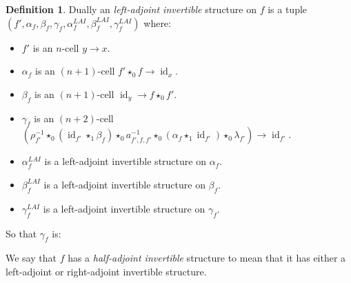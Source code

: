 \documentclass[draft]{article}
\theoremstyle{definition} \newtheorem{definition}{Definition}
\theoremstyle{remark} \newtheorem{remark}{Remark}
\DeclareMathOperator{\id}{id}
\newcommand{\inv}[1]{#1^{-1}} \newcommand{\comp}{\star}
\begin{document}
\begin{definition}
  Dually an \emph{left-adjoint invertible} structure on \(f\) is a
  tuple \((f', \alpha_f, \beta_f, \gamma_f, \alpha_f^{LAI},
  \beta_f^{LAI}, \gamma_f^{LAI})\) where:
  \begin{itemize}
  \item \(f'\) is an \(n\)-cell \(y \to x\).
  \item \(\alpha_f\) is an \((n+1)\)-cell \(f' \comp_0 f \to \id_x\).
  \item \(\beta_f\) is an \((n+1)\)-cell \(\id_y \to f \comp_0 f'\).
  \item \(\gamma_f\) is an \((n+2)\)-cell \((\rho_{f'}^{-1} \comp_0
    (\id_{f'} \comp_1 \beta_f) \comp_0 \inv {a_{f',f,f'}} \comp_0
    (\alpha_f \comp_1 \id_{f'}) \comp_0 \lambda_{f'}) \to \id_{f'}\).
  \item \(\alpha_f^{LAI}\) is a left-adjoint invertible structure on
    \(\alpha_f\).
  \item \(\beta_f^{LAI}\) is a left-adjoint invertible structure on
    \(\beta_f\).
  \item \(\gamma_f^{LAI}\) is a left-adjoint invertible structure on
    \(\gamma_f\).
  \end{itemize}

  So that \(\gamma_f\) is:
  \begin{center}
  \end{center}

  We say that \(f\) has a \emph{half-adjoint invertible} structure to
  mean that it has either a left-adjoint or right-adjoint invertible
  structure.
\end{definition}
\end{document}
